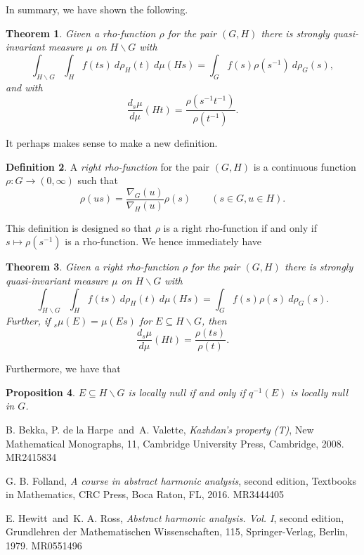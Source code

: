\documentclass[11pt,a4paper]{article}
\newtheorem{theorem}{Theorem}[section]
\newtheorem{proposition}[theorem]{Proposition}
\theoremstyle{definition}
\newtheorem{definition}[theorem]{Definition}
\newcommand{\bs}{\backslash}
\begin{document}
In summary, we have shown the following.

\begin{theorem}
Given a rho-function $\rho$ for the pair $(G,H)$ there is strongly quasi-invariant
measure $\mu$ on $H\bs G$ with
\[ \int_{H\bs G} \int_H f(ts) \ d\rho_H(t) \ d\mu(Hs)
= \int_G f(s) \rho(s^{-1}) \ d\rho_G(s), \]
and with
\[ \frac{d{{}_s\mu}}{d\mu}(Ht) = \frac{\rho(s^{-1}t^{-1})}{\rho(t^{-1})}. \]
\end{theorem}

It perhaps makes sense to make a new definition.

\begin{definition}
A \emph{right rho-function} for the pair $(G,H)$ is a continuous function $\rho:G\rightarrow
(0,\infty)$ such that
\[ \rho(us) = \frac{\nabla_G(u)}{\nabla_H(u)} \rho(s)
\qquad (s\in G, u\in H). \]
\end{definition}

This definition is designed so that $\rho$ is a right rho-function if and only if $s\mapsto
\rho(s^{-1})$ is a rho-function.  We hence immediately have

\begin{theorem}
Given a right rho-function $\rho$ for the pair $(G,H)$ there is strongly quasi-invariant
measure $\mu$ on $H\bs G$ with
\[ \int_{H\bs G} \int_H f(ts) \ d\rho_H(t) \ d\mu(Hs)
= \int_G f(s) \rho(s) \ d\rho_G(s). \]
Further, if ${}_s\mu(E) = \mu(Es)$ for $E\subseteq H\bs G$, then
\[ \frac{d{{}_s\mu}}{d\mu}(Ht) = \frac{\rho(ts)}{\rho(t)}. \]
\end{theorem}

Furthermore, we have that

\begin{proposition}
$E\subseteq H\bs G$ is locally null if and only if $q^{-1}(E)$ is locally null in $G$.
\end{proposition}



\begin{thebibliography}{99}

 B. Bekka, P. de la Harpe\ and\ A. Valette, {\it Kazhdan's property (T)}, New Mathematical Monographs, 11, Cambridge University Press, Cambridge, 2008. MR2415834

 G. B. Folland, {\it A course in abstract harmonic analysis}, second edition, Textbooks in Mathematics, CRC Press, Boca Raton, FL, 2016. MR3444405

 E. Hewitt\ and\ K. A. Ross, {\it Abstract harmonic analysis. Vol. I}, second edition, Grundlehren der Mathematischen Wissenschaften, 115, Springer-Verlag, Berlin, 1979. MR0551496

\end{thebibliography}
\end{document}
